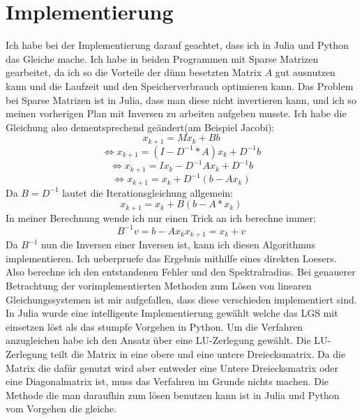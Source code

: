 \documentclass[a4paper, 11pt]{article}
\begin{document}
\section{Implementierung}
Ich habe bei der Implementierung darauf geachtet, dass ich in Julia und Python das Gleiche mache. Ich habe in beiden Programmen mit Sparse Matrizen gearbeitet, da ich so die Vorteile der d\"unn besetzten Matrix \(A\) gut ausnutzen kann und 
die Laufzeit und den Speicherverbrauch optimieren kann. Das Problem bei Sparse Matrizen ist in Julia, dass man diese nicht invertieren kann, und ich so meinen vorherigen Plan mit Inversen zu arbeiten aufgeben musste. 
Ich habe die Gleichung also dementsprechend ge\"andert(am Beispiel Jacobi): 
\begin{equation}
x_{k+1}=Mx_{k}+Bb
\end{equation}
\begin{equation}
\Leftrightarrow x_{k+1}=(I-D^{-1}*A)x_{k}+D^{-1}b
\end{equation}
\begin{equation}
  \Leftrightarrow x_{k+1}=Ix_{k}-D^{-1}Ax_{k}+D^{-1}b
\end{equation}
\begin{equation}
\Leftrightarrow x_{k+1}=x_{k}+D^{-1}(b-Ax_{k})
\end{equation}
Da \(B= D^{-1}\) lautet die Iterationsgleichung allgemein: \begin{equation}x_{k+1}=x_{k}+B(b-A*x_{k})\end{equation}
In meiner Berechnung wende ich nur einen Trick an ich berechne immer:
\begin{equation} 
B^{-1}v=b-Ax_{k}
x_{k+1}=x_{k}+v
\end{equation}
Da \(B^{-1}\) nun die Inversen einer Inversen ist, kann ich diesen Algorithmus implementieren.
Ich ueberpruefe das Ergebnis mithilfe eines direkten Loesers. Also berechne ich den entstandenen Fehler und den Spektralradius. 
Bei genauerer Betrachtung der vorimplementierten Methoden zum L\"osen von linearen Gleichungssystemen ist mir aufgefallen, dass 
diese verschieden implementiert sind. In Julia wurde eine intelligente Implementierung gew\"ahlt welche das LGS mit einsetzen l\"ost als das stumpfe Vorgehen in Python. 
Um die Verfahren anzugleichen habe ich den Ansatz \"uber eine LU-Zerlegung gew\"ahlt. Die LU-Zerlegung teilt die Matrix in eine obere und eine untere Dreiecksmatrix. 
Da die Matrix die daf\"ur genutzt wird aber entweder eine Untere Dreiecksmatrix oder eine Diagonalmatrix ist, muss das Verfahren im Grunde nichts machen. 
Die Methode die man daraufhin zum l\"osen benutzen kann ist in Julia und Python vom Vorgehen die gleiche.
\end{document}
